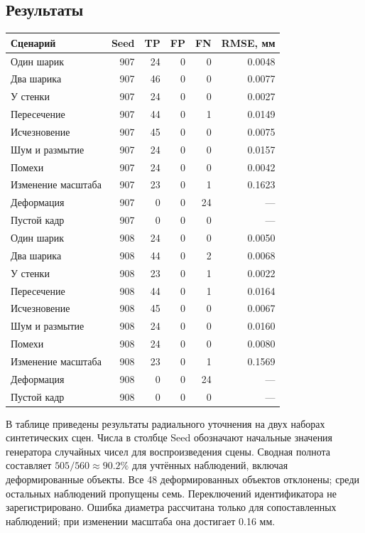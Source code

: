 \documentclass[12pt,a4paper]{article}
\begin{document}
\subsection{Результаты}
\begin{longtable}{lrrrrr}
\toprule
Сценарий & Seed & TP & FP & FN & RMSE, мм \\
\midrule
Один шарик & 907 & 24 & 0 & 0 & 0.0048 \\
Два шарика & 907 & 46 & 0 & 0 & 0.0077 \\
У стенки & 907 & 24 & 0 & 0 & 0.0027 \\
Пересечение & 907 & 44 & 0 & 1 & 0.0149 \\
Исчезновение & 907 & 45 & 0 & 0 & 0.0075 \\
Шум и размытие & 907 & 24 & 0 & 0 & 0.0157 \\
Помехи & 907 & 24 & 0 & 0 & 0.0042 \\
Изменение масштаба & 907 & 23 & 0 & 1 & 0.1623 \\
Деформация & 907 & 0 & 0 & 24 & --- \\
Пустой кадр & 907 & 0 & 0 & 0 & --- \\
Один шарик & 908 & 24 & 0 & 0 & 0.0050 \\
Два шарика & 908 & 44 & 0 & 2 & 0.0068 \\
У стенки & 908 & 23 & 0 & 1 & 0.0022 \\
Пересечение & 908 & 44 & 0 & 1 & 0.0164 \\
Исчезновение & 908 & 45 & 0 & 0 & 0.0067 \\
Шум и размытие & 908 & 24 & 0 & 0 & 0.0160 \\
Помехи & 908 & 24 & 0 & 0 & 0.0080 \\
Изменение масштаба & 908 & 23 & 0 & 1 & 0.1569 \\
Деформация & 908 & 0 & 0 & 24 & --- \\
Пустой кадр & 908 & 0 & 0 & 0 & --- \\
\bottomrule
\end{longtable}
В таблице приведены результаты радиального уточнения на двух наборах синтетических сцен. Числа в столбце Seed обозначают начальные значения генератора случайных чисел для воспроизведения сцены. Сводная полнота составляет $505/560\approx90.2\%$ для учтённых наблюдений, включая деформированные объекты. Все 48 деформированных объектов отклонены; среди остальных наблюдений пропущены семь. Переключений идентификатора не зарегистрировано. Ошибка диаметра рассчитана только для сопоставленных наблюдений; при изменении масштаба она достигает 0.16 мм.
\end{document}

